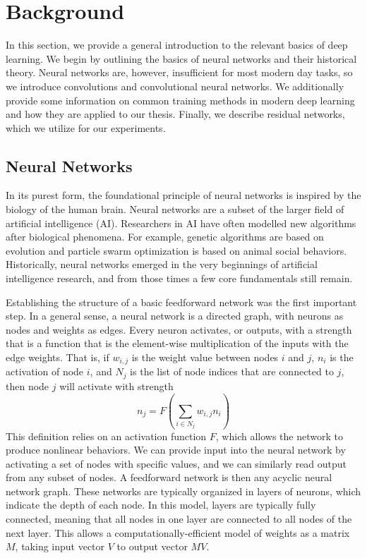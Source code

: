 \chapter{Background}

In this section, we provide a general introduction to the relevant basics of deep learning.
We begin by outlining the basics of neural networks and their historical theory.
Neural networks are, however, insufficient for most modern day tasks, so we introduce convolutions and convolutional neural networks.
We additionally provide some information on common training methods in modern deep learning and how they are applied to our thesis.
Finally, we describe residual networks, which we utilize for our experiments.


\section{Neural Networks}
In its purest form, the foundational principle of neural networks is inspired by the biology of the human brain.
Neural networks are a subset of the larger field of artificial intelligence (AI).
Researchers in AI have often modelled new algorithms after biological phenomena. For example, genetic algorithms are based on evolution and particle swarm optimization is based on animal social behaviors.
Historically, neural networks emerged in the very beginnings of artificial intelligence research, and from those times a few core fundamentals still remain.

Establishing the structure of a basic feedforward network was the first important step.
In a general sense, a neural network is a directed graph, with neurons as nodes and weights as edges.
Every neuron activates, or outputs, with a strength that is a function that is the element-wise multiplication of the inputs with the edge weights.
That is, if $w_{i,j}$ is the weight value between nodes $i$ and $j$, $n_i$ is the activation of node $i$, and $N_j$ is the list of node indices that are connected to $j$, then node $j$ will activate with strength
\[n_j = F\left(\sum_{i \in N_j} w_{i,j}n_i \right)\]
This definition relies on an activation function $F$, which allows the network to produce nonlinear behaviors.
We can provide input into the neural network by activating a set of nodes with specific values, and we can similarly read output from any subset of nodes.
A feedforward network is then any acyclic neural network graph.
These networks are typically organized in layers of neurons, which indicate the depth of each node.
In this model, layers are typically fully connected, meaning that all nodes in one layer are connected to all nodes of the next layer.
This allows a computationally-efficient model of weights as a matrix $M$, taking input vector $V$ to output vector $MV$.

